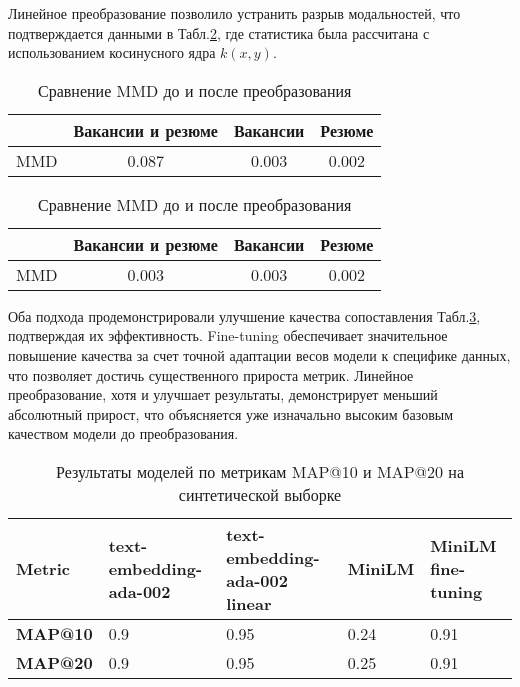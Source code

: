 \documentclass{article}
\begin{document}
Линейное преобразование позволило устранить разрыв модальностей, что подтверждается данными в Табл.\ref{tab:mmd}, где статистика была рассчитана с использованием косинусного ядра \(k(x, y)\).

\begin{table}[h!]
\centering
\begin{minipage}{0.45\textwidth}
\centering
\begin{tabular}{|l|c|c|c|}
\hline
\textbf{} & \textbf{Вакансии и резюме} & \textbf{Вакансии} & \textbf{Резюме} \\ \hline
MMD       & 0.087                         & 0.003                & 0.002              \\ \hline
\end{tabular}
\caption{До преобразования}
\label{tab:1}
\end{minipage}
\hfill
\begin{minipage}{0.45\textwidth}
\centering
\begin{tabular}{|l|c|c|c|}
\hline
\textbf{} & \textbf{Вакансии и резюме} & \textbf{Вакансии} & \textbf{Резюме} \\ \hline
MMD       & 0.003                          & 0.003                & 0.002              \\ \hline
\end{tabular}
\caption{После линейного преобразования}
\label{tab:2}
\end{minipage}
\caption{Сравнение MMD до и после преобразования}
\label{tab:mmd}
\end{table}

Оба подхода продемонстрировали улучшение качества сопоставления Табл.\ref{tab:results_2}, подтверждая их эффективность. Fine-tuning обеспечивает значительное повышение качества за счет точной адаптации весов модели к специфике данных, что позволяет достичь существенного прироста метрик. Линейное преобразование, хотя и улучшает результаты, демонстрирует меньший абсолютный прирост, что объясняется уже изначально высоким базовым качеством модели до преобразования.



\begin{table}[h!]
\centering
\begin{tabularx}{\textwidth}{lXXXX}
\toprule
\textbf{Metric} & \textbf{text-embedding-ada-002} & \textbf{text-embedding-ada-002 linear} & \textbf{MiniLM} & \textbf{MiniLM fine-tuning} \\
\midrule
\textbf{MAP@10} & 0.9 & 0.95 & 0.24 & 0.91 \\
\textbf{MAP@20} & 0.9 & 0.95 & 0.25 & 0.91 \\
\bottomrule
\end{tabularx}
\caption{Результаты моделей по метрикам MAP@10 и MAP@20 на синтетической выборке}
\label{tab:results_2}
\end{table}
\end{document}
